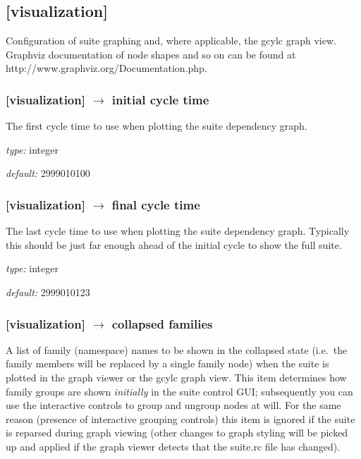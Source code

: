 \subsection{[visualization]}

Configuration of suite graphing and, where applicable, the gcylc graph view.
Graphviz documentation of node shapes and so on can be found at 
http://www.graphviz.org/Documentation.php.

\subsubsection[initial cycle time]{[visualization] $\rightarrow$ initial cycle time}

The first cycle time to use when plotting the suite dependency graph.
\begin{myitemize}
    \item {\em type:} integer
    \item {\em default:} 2999010100
\end{myitemize}

\subsubsection[final cycle time]{[visualization] $\rightarrow$ final cycle time}

The last cycle time to use when plotting the suite dependency graph.
Typically this should be just far enough ahead of the initial cycle to
show the full suite.

\begin{myitemize}
    \item {\em type:} integer
    \item {\em default:} 2999010123
\end{myitemize}

\subsubsection[collapsed families]{[visualization] $\rightarrow$ collapsed families}

A list of family (namespace) names to be shown in the collapsed state
(i.e.\ the family members will be replaced by a single family node) when
the suite is plotted in the graph viewer or the gcylc graph view. This
item determines how family groups are shown 
{\em initially} in the suite control GUI; subsequently you can use the
interactive controls to group and ungroup nodes at will. For the same
reason (presence of interactive grouping controls) this item is ignored
if the suite is reparsed during graph viewing (other changes to graph
styling will be picked up and applied if the graph viewer detects that
the suite.rc file has changed). 

